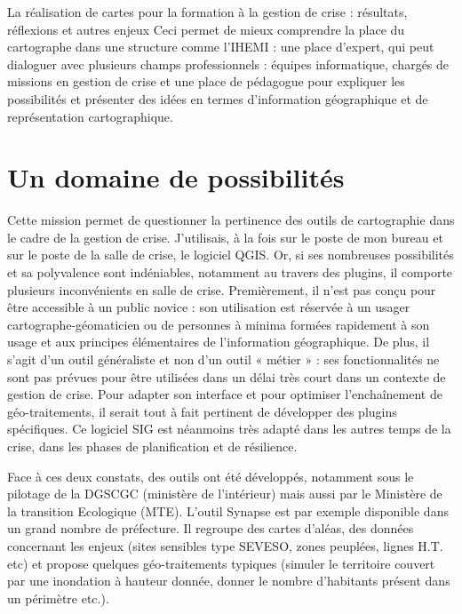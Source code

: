 \documentclass[10pt,a4paper]{report} %
\newcommand{\mychapter}[2]{ %
    \setcounter{chapter}{#1}
    \setcounter{section}{0}
    \chapter*{#2}
    \addcontentsline{toc}{chapter}{#2}
}
\begin{document}
\begin{part}{La réalisation de cartes pour la formation à la gestion de crise : résultats, réflexions et autres enjeux}
Ceci permet de mieux comprendre la place du cartographe dans une structure comme l’IHEMI : une place d’expert, qui peut dialoguer avec plusieurs champs professionnels : équipes informatique, chargés de missions en gestion de crise et une place de pédagogue pour expliquer les possibilités et présenter des idées en termes d’information géographique et de représentation cartographique.

\mychapter{6}{Un domaine de possibilités}
Cette mission permet de questionner la pertinence des outils de cartographie dans le cadre de la gestion de crise. J’utilisais, à la fois sur le poste de mon bureau et sur le poste de la salle de crise, le logiciel QGIS. Or, si ses nombreuses possibilités et sa polyvalence sont indéniables, notamment au travers des plugins, il comporte plusieurs inconvénients en salle de crise. Premièrement, il n’est pas conçu pour être accessible à un public novice : son utilisation est réservée à un usager cartographe-géomaticien ou de personnes à minima formées rapidement à son usage et aux principes élémentaires de l’information géographique. De plus, il s’agit d’un outil généraliste et non d’un outil « métier » : ses fonctionnalités ne sont pas prévues pour être utilisées dans un délai très court dans un contexte de gestion de crise. Pour adapter son interface et pour optimiser l’enchaînement de géo-traitements, il serait tout à fait pertinent de développer des plugins spécifiques. Ce logiciel SIG est néanmoins très adapté dans les autres temps de la crise, dans les phases de planification et de résilience.

Face à ces deux constats, des outils ont été développés, notamment sous le pilotage de la DGSCGC (ministère de l’intérieur) mais aussi par le Ministère de la transition Ecologique (MTE). L’outil Synapse est par exemple disponible dans un grand nombre de préfecture. Il regroupe des cartes d’aléas, des données concernant les enjeux (sites sensibles type SEVESO, zones peuplées, lignes H.T. etc) et propose quelques géo-traitements typiques (simuler le territoire couvert par une inondation à hauteur donnée, donner le nombre d’habitants présent dans un périmètre etc.).


\end{part}
\end{document}
